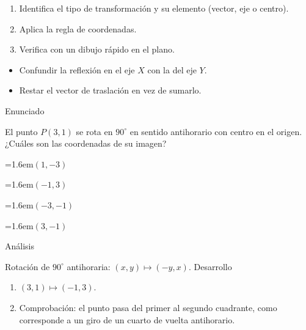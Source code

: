 \documentclass[10pt,a4paper,twocolumn]{article}
\newcommand{\alternativa}[2]{\par\noindent\hangindent=1.6em\hangafter=1\makebox[1.6em][l]{\tecla{#1}}#2\par}
\newcommand{\clave}[1]{\par\smallskip{\sffamily\footnotesize\color{esmeralda} Clave \teclaok{#1}}\par}
\begin{document}
\begin{metodo}
\begin{enumerate}
  \item Identifica el tipo de transformación y su elemento (vector, eje o centro).
  \item Aplica la regla de coordenadas.
  \item Verifica con un dibujo rápido en el plano.
\end{enumerate}
\end{metodo}

\begin{errorfrecuente}
\begin{itemize}
  \item Confundir la reflexión en el eje $X$ con la del eje $Y$.
  \item Restar el vector de traslación en vez de sumarlo.
\end{itemize}
\end{errorfrecuente}

\begin{ejemplo}
{\sffamily\footnotesize\color{zinc500} Enunciado}\par
El punto $P(3,1)$ se rota en $90^\circ$ en sentido antihorario con centro en el origen. ¿Cuáles son las coordenadas de su imagen?
\alternativa{A}{$(1,-3)$}
\alternativa{B}{$(-1,3)$}
\alternativa{C}{$(-3,-1)$}
\alternativa{D}{$(3,-1)$}
\clave{B}
{\sffamily\footnotesize\color{zinc500} Análisis}\par Rotación de $90^\circ$ antihoraria: $(x,y)\mapsto(-y,x)$.
{\sffamily\footnotesize\color{zinc500} Desarrollo}
\begin{enumerate}
  \item $(3,1)\mapsto(-1,3)$.
  \item Comprobación: el punto pasa del primer al segundo cuadrante, como corresponde a un giro de un cuarto de vuelta antihorario.
\end{enumerate}
\end{ejemplo}
\end{document}

